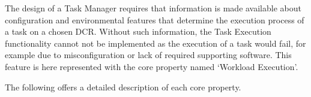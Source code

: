 \documentclass{sig-alternate}
\begin{document}
The design of a Task Manager requires that information is made available about
configuration and environmental features that determine the execution process of
a task on a chosen DCR. Without such information, the Task Execution
functionality cannot not be implemented as the execution of a task would fail,
for example due to misconfiguration or lack of required supporting software.
This feature is here represented with the core property named `Workload
Execution'.

The following offers a detailed description of each core property.




\end{document}
